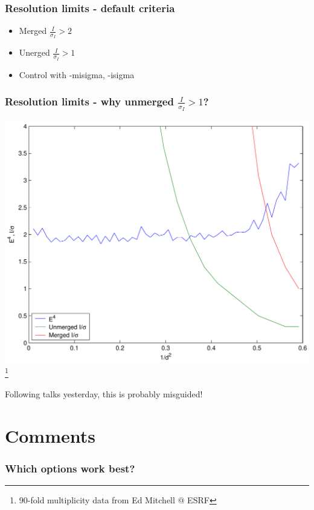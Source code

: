 \documentclass[slides,compress]{beamer}
\begin{document}
\begin{frame}
\frametitle{Resolution limits - default criteria}
\begin{itemize}
\item{Merged $\frac{I}{\sigma_I} > 2$}
\item{Unerged $\frac{I}{\sigma_I} > 1$}
\item{Control with -misigma, -isigma}
\end{itemize}
\end{frame}

\begin{frame}
\frametitle{Resolution limits - why unmerged $\frac{I}{\sigma_I} > 1$?}
\hspace{6cm}
\includegraphics[scale=0.5]{figures/plat-13A-z4.pdf}
\footnote{90-fold multiplicity data from Ed Mitchell @ ESRF}
\end{frame}

\begin{frame}
\begin{center}
\Huge Following talks yesterday, this is probably misguided!
\end{center}
\end{frame}

\section{Comments}

\begin{frame}
\frametitle{Which options work best?}
\begin{itemize}
\end{itemize}
\end{frame}
\end{document}
